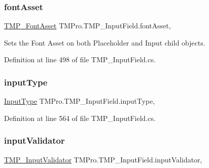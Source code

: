 \mbox{\label{class_t_m_pro_1_1_t_m_p___input_field_ac13a97bd7e0eb0e19b5a50efc11adb67}} 
\subsubsection{\texorpdfstring{fontAsset}{fontAsset}}
{\footnotesize\ttfamily \mbox{\hyperlink{class_t_m_pro_1_1_t_m_p___font_asset}{T\+M\+P\+\_\+\+Font\+Asset}} T\+M\+Pro.\+T\+M\+P\+\_\+\+Input\+Field.\+font\+Asset\hspace{0.3cm}{\ttfamily [get]}, {\ttfamily [set]}}



Sets the Font Asset on both Placeholder and Input child objects. 



Definition at line 498 of file T\+M\+P\+\_\+\+Input\+Field.\+cs.

\mbox{\label{class_t_m_pro_1_1_t_m_p___input_field_a5c3a71f562853f264523c61e0f719683}} 
\subsubsection{\texorpdfstring{inputType}{inputType}}
{\footnotesize\ttfamily \mbox{\hyperlink{class_t_m_pro_1_1_t_m_p___input_field_ab72a4b889f55cc4a2f98611fca609ccf}{Input\+Type}} T\+M\+Pro.\+T\+M\+P\+\_\+\+Input\+Field.\+input\+Type\hspace{0.3cm}{\ttfamily [get]}, {\ttfamily [set]}}



Definition at line 564 of file T\+M\+P\+\_\+\+Input\+Field.\+cs.

\mbox{\label{class_t_m_pro_1_1_t_m_p___input_field_a0133238d9e97ac0eafb921dede2f9ff7}} 
\subsubsection{\texorpdfstring{inputValidator}{inputValidator}}
{\footnotesize\ttfamily \mbox{\hyperlink{class_t_m_pro_1_1_t_m_p___input_validator}{T\+M\+P\+\_\+\+Input\+Validator}} T\+M\+Pro.\+T\+M\+P\+\_\+\+Input\+Field.\+input\+Validator\hspace{0.3cm}{\ttfamily [get]}, {\ttfamily [set]}}



